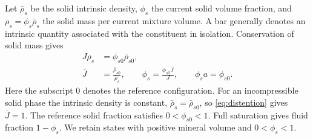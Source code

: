 \documentclass[11pt]{article}
\begin{document}
Let \(\bar\rho_s\) be the solid intrinsic density, \(\phi_s\) the current
solid volume fraction, and \(\rho_s=\phi_s\bar\rho_s\) the solid mass
per current mixture volume. A bar generally denotes an intrinsic quantity
associated with the constituent in isolation. Conservation of solid mass gives
\begin{align}
 J\rho_s&=\phi_{s0}\bar\rho_{s0},
 \label{eq:solid-mass}\\
 \bar J&=\frac{\bar\rho_{s0}}{\bar\rho_s},\qquad
 \phi_s=\frac{\phi_{s0}\bar J}{J},\qquad
 \phi_s a=\phi_{s0}.
 \label{eq:distention}
\end{align}
Here the subscript \(0\) denotes the reference configuration.
For an incompressible solid phase the intrinsic density is constant,
\(\bar\rho_s=\bar\rho_{s0}\), so \eqref{eq:distention} gives \(\bar J=1\).
The reference solid fraction satisfies \(0<\phi_{s0}<1\). Full saturation
gives fluid fraction \(1-\phi_s\). We retain states with positive mineral
volume and \(0<\phi_s<1\).
\end{document}
